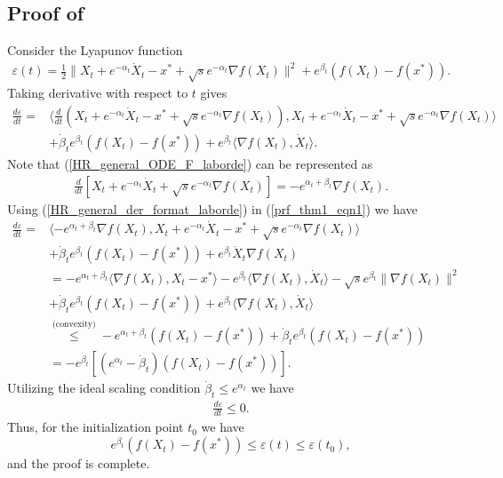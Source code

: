 \documentclass{article}
\theoremstyle{plain}
\theoremstyle{definition}
\theoremstyle{remark}
\begin{document}
\subsection{Proof of }\label{thm1_proof}
Consider the Lyapunov function 
\begin{align}\label{lyap_theorem_C}
    \varepsilon(t)=\frac{1}{2}\|X_t+e^{-\alpha_t}\dot X_t-x^*+\sqrt{s}e^{-\alpha_t}\nabla f(X_t)\|^2+e^{\beta_t}(f(X_t)-f(x^*)).
\end{align}
Taking derivative with respect to $t$ gives
\begin{align}\label{prf_thm1_eqn1}
    \frac{d \varepsilon}{dt}=&\langle \frac{d}{dt}(X_t+e^{-\alpha_t}\dot X_t-x^*+\sqrt{s}e^{-\alpha_t}\nabla f(X_t)),X_t+e^{-\alpha_t}\dot X_t-x^*+\sqrt{s}e^{-\alpha_t}\nabla f(X_t)\rangle\nonumber\\
    & +\dot \beta_t e^{\beta_t}(f(X_t)-f(x^*))+e^{\beta_t}\langle \nabla f(X_t), \dot X_t\rangle.
\end{align}
Note that (\ref{HR_general_ODE_F_laborde}) can be represented as
\begin{align}\label{HR_general_der_format_laborde}
    \frac{d}{dt}\left[X_t+e^{-\alpha_t}\dot X_t+\sqrt{s}e^{-\alpha_t}\nabla f(X_t)\right]=-e^{\alpha_t+\beta_t}\nabla f(X_t).
\end{align}
Using (\ref{HR_general_der_format_laborde}) in (\ref{prf_thm1_eqn1}) we have
\begin{align}
     \frac{d \varepsilon}{dt}=& \langle -e^{\alpha_t+\beta_t}\nabla f(X_t),X_t+e^{-\alpha_t}\dot X_t-x^*+\sqrt{s}e^{-\alpha_t}\nabla f(X_t) \rangle \nonumber \\
     &+\dot \beta_t e^{\beta_t}(f(X_t)-f(x^*))+e^{\beta_t}\dot X_t\nabla f(X_t)\nonumber\\
     &= -e^{\alpha_t+\beta_t}\langle\nabla f(X_t),X_t-x^*\rangle -e^{\beta_t}\langle \nabla f(X_t),\dot X_t\rangle -\sqrt{s}e^{\beta_t}\|\nabla f(X_t)\|^2\nonumber\\
     &+\dot \beta_te^{\beta_t}(f(X_t)-f(x^*))+e^{\beta_t}\langle \nabla f(X_t),\dot X_t \rangle\nonumber\\
     & \overset{\text{(convexity)}}{\leq} -e^{\alpha_t+\beta_t}(f(X_t)-f(x^*))+\dot \beta_te^{\beta_t}(f(X_t)-f(x^*))\nonumber\\
     & = -e^{\beta_t}\left[(e^{\alpha_t}-\dot \beta_t)(f(X_t)-f(x^*))\right].\nonumber
\end{align}
Utilizing the ideal scaling condition $\dot \beta_t\leq e^{\alpha_t}$ we have
\begin{align}
     \frac{d \varepsilon}{dt}\leq 0.\nonumber
\end{align}
Thus, for the initialization point $t_0$ we have
$$e^{\beta_t}(f(X_t)-f(x^*))\leq \varepsilon(t)\leq \varepsilon(t_0),$$
and the proof is complete.
\end{document}
